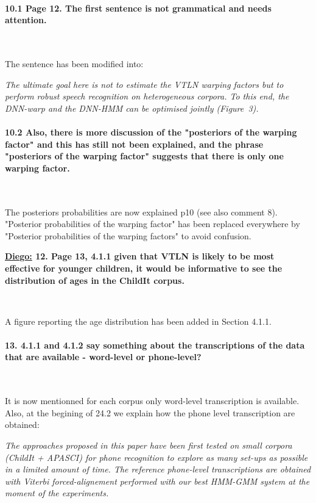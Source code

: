 \documentclass[]{article}
\begin{document}
\paragraph{10.1 Page 12. The first sentence is not grammatical and needs attention.}

~

The sentence has been modified into:

\textit{The ultimate goal here is not to estimate the VTLN warping factors but to perform robust speech recognition on heterogeneous corpora. To this end, the DNN-warp and the DNN-HMM can be optimised jointly (Figure~3).}

\paragraph{10.2 Also, there is more discussion of the "posteriors of the warping factor" and this has still not been explained, and the phrase "posteriors of the warping factor" suggests that there is only one warping factor.}

~

The posteriors probabilities are now explained p10 (see also comment 8). "Posterior probabilities of the warping factor" has been replaced everywhere by "Posterior probabilities of the warping factors" to avoid confusion.

\textbf{\underline{Diego:} 12. Page 13, 4.1.1 given that VTLN is likely to be most effective for younger children, it would be informative to see the distribution of ages in the ChildIt corpus.}

~

A figure reporting the age distribution has been added in Section 4.1.1.


\paragraph{13. 4.1.1 and 4.1.2 say something about the transcriptions of the data that are available - word-level or phone-level?}

~

It is now mentionned for each corpus only word-level transcription is available. Also, at the begining of 24.2 we explain how the phone level transcription are obtained:

\textit{The approaches proposed in this paper have been first tested on small corpora (ChildIt + APASCI) for phone recognition to explore as many set-ups as possible in a limited amount of time. The reference phone-level transcriptions are obtained with Viterbi forced-alignement performed with our best HMM-GMM system at the moment of the experiments.}
\end{document}

